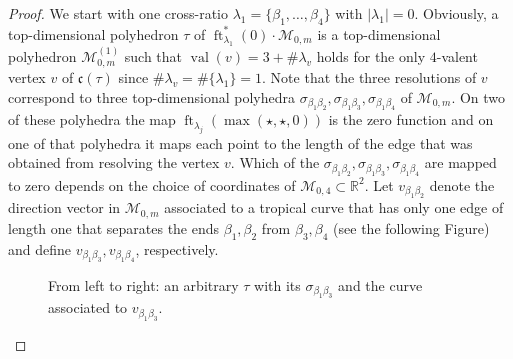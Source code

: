 \documentclass[11pt,reqno,a4]{amsart}
\theoremstyle{dotless}
\theoremstyle{definition}
\newcommand{\ft}{\operatorname{ft}}
\newcommand{\val}{\operatorname{val}}
\begin{document}
\begin{proof}
We start with one cross-ratio $\lambda_1=\lbrace\beta_1,\dots,\beta_4\rbrace$ with $|\lambda_1|=0$. Obviously, a top-dimensional polyhedron $\tau$ of $\ft^*_{\lambda_1}\left( 0 \right)\cdot\mathcal{M}_{0,m}$ is a top-dimensional polyhedron $\mathcal{M}_{0,m}^{(1)}$ such that $\val(v)=3+\#\lambda_v$ holds for the only $4$-valent vertex $v$ of $\mathfrak{c}(\tau)$ since $\#\lambda_v=\#\lbrace\lambda_1\rbrace=1$. Note that the three resolutions of $v$ correspond to three top-dimensional polyhedra $\sigma_{\beta_1\beta_2},\sigma_{\beta_1\beta_3},\sigma_{\beta_1\beta_4}$ of $\mathcal{M}_{0,m}$. On two of these polyhedra the map $\ft_{\lambda_j}\left(\max(\star,\star,0)\right)$ is the zero function and on one of that polyhedra it maps each point to the length of the edge that was obtained from resolving the vertex $v$. Which of the $\sigma_{\beta_1\beta_2},\sigma_{\beta_1\beta_3},\sigma_{\beta_1\beta_4}$ are mapped to zero depends on the choice of coordinates of $\mathcal{M}_{0,4}\subset\mathbb{R}^2$. Let $v_{\beta_1\beta_2}$ denote the direction vector in $\mathcal{M}_{0,m}$ associated to a tropical curve that has only one edge of length one that separates the ends $\beta_1,\beta_2$ from $\beta_3,\beta_4$ (see the following Figure) and define $v_{\beta_1\beta_3},v_{\beta_1\beta_4}$, respectively.


\begin{figure}[H]
\centering
\def\svgwidth{400pt}

\caption{From left to right: an arbitrary $\tau$ with its $\sigma_{\beta_1\beta_3}$ and the curve associated to $v_{\beta_1\beta_3}$.}
\label{Proof_structure_of_X_notation}
\end{figure}


\end{proof}
\end{document}
